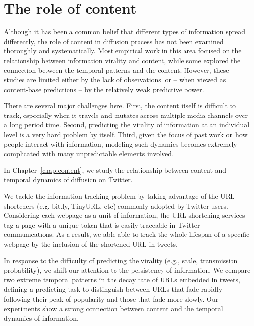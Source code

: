 \documentclass[phd,tocprelim]{cornell}
\begin{document}
\section{The role of content}
Although it has been a common belief that different types of information spread differently, the role of content in diffusion process has not been examined thoroughly and systematically. Most empirical work in this area focused on the relationship between information virality and content\cite{Berger-2010,Hansen:11}, while some explored the connection between the temporal patterns and the content\cite{Gruhl-2004,crane:2008}. However, these studies are limited either by the lack of observations, or -- when viewed as content-base predictions -- by the relatively weak predictive power. 



There are several major challenges here. First, the content itself is difficult to track, especially when it travels and mutates across multiple media channels over a long period time\cite{Leskovec-Newscycle-2009}.  Second, predicting the virality of information at an individual level is a very hard problem by itself\cite{Bakshy-2011,Szabo-2010}. Third, given the focus of past work on how people interact with information, modeling such dynamics becomes extremely complicated with many unpredictable elements involved\cite{yang-2010,Yang-2011,Wu-Twitter-2011,Bakshy-2011}. 

In Chapter~\ref{chap:content}, we study the relationship between content and temporal dynamics of diffusion on Twitter. 

We tackle the information tracking problem by taking advantage of the URL shorteners (e.g. bit.ly, TinyURL, etc) commonly adopted by Twitter users. Considering each webpage as a unit of information, the URL shortening services tag a page with a unique token that is easily traceable in Twitter communications. As a result, we able able to track the whole lifespan of a specific webpage by the inclusion of the shortened URL in tweets. 

In response to the difficulty of predicting the virality (e.g., scale, transmission probability), we shift our attention to the persistency of information. We compare two extreme temporal patterns in the decay rate of URLs embedded in tweets, defining a predicting task to distinguish between URLs that fade rapidly following their peak of popularity and those that fade more slowly. Our experiments show a strong connection between content and the temporal dynamics of information.
\end{document}
